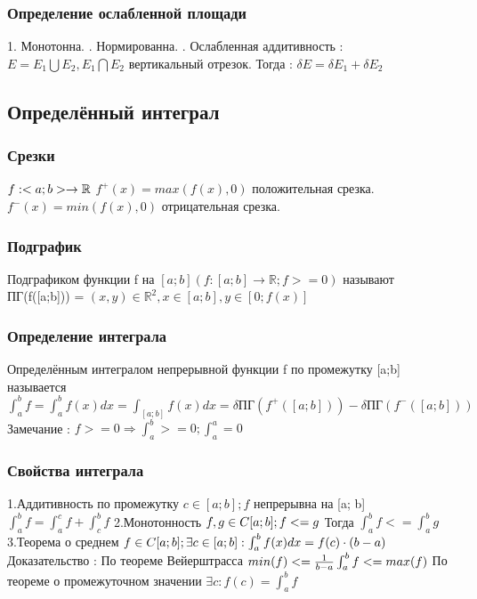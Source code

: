 \documentclass[12pt, a4paper]{article}
\newcommand{\nl}{\newline}
\newcommand{\intba}{\int^b_a}
\begin{document}
        \subsubsection{Определение ослабленной площади}
        1. Монотонна. \nl
        2. Нормированна. \nl
        3. Ослабленная аддитивность : $E = E_1 \bigcup E_2, E_1 \bigcap E_2$ вертикальный отрезок.\nl 
        Тогда : $\delta E = \delta E_1 + \delta E_2$
        
        
    \subsection{Определённый интеграл}
        \subsubsection{Срезки}
        
        $f : <a; b> \rightarrow \mathbb{R} \nl$
        $f^+(x) = max(f(x), 0)$ положительная срезка. \nl
        $f^-(x) = min(f(x), 0)$ отрицательная срезка. \nl
        
        \subsubsection{Подграфик}
        Подграфиком функции f на $[a; b] (f : [a;b]\rightarrow \mathbb{R}; f>=0)$ называют \nl
        ПГ(f([a;b])) = {$(x, y) \in \mathbb{R}^2, x \in [a; b], y \in [0; f(x)]$}
        
        \subsubsection{Определение интеграла}
        Определённым интегралом непрерывной функции f по промежутку [a;b] называется \nl
        $\int^b_a f = \int^b_a f(x) dx = \int_{[a; b]} f(x) dx = \delta \text{ПГ}(f^+([a; b])) - \delta \text{ПГ}(f^-([a; b]))$ \nl
        Замечание : $f>=0 \Rightarrow \int^b_a >=0; \int^a_a = 0$
        
        \subsubsection{Свойства интеграла}
        1.Аддитивность по промежутку \nl
        $c \in [a;b]; f$ непрерывна на [a; b] \nl
        $\int_a^b f = \int_a^c f + \int^b_c f$ \nl
        2.Монотонность \nl
        $f, g \in C[a; b]; f<=g \nl$
        Тогда $\int^b_a f <= \int^b_a g$ \nl
        3.Теорема о среднем \nl
        $f \in C[a;b]; \exists c \in [a;b] : \int^b_a f(x)dx = f(c) \cdot (b-a) \nl$
        Доказательство : \nl
        По теореме Вейерштрасса $min(f) <= \frac{1}{b-a}\intba f <=max(f) \nl$
        По теореме о промежуточном значении $\exists c : f(c) = \intba f$
        
\end{document}
